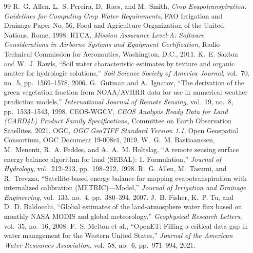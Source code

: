 \documentclass[11pt,a4paper]{article}
\theoremstyle{definition}
\theoremstyle{remark}
\begin{document}
\begin{thebibliography}{99}
 R.~G. Allen, L.~S. Pereira, D.~Raes, and M.~Smith, \textit{Crop Evapotranspiration: Guidelines for Computing Crop Water Requirements}, FAO Irrigation and Drainage Paper No. 56, Food and Agriculture Organization of the United Nations, Rome, 1998.
 RTCA, \textit{Mission Assurance Level-A: Software Considerations in Airborne Systems and Equipment Certification}, Radio Technical Commission for Aeronautics, Washington, D.C., 2011.
 K.~E. Saxton and W.~J. Rawls, ``Soil water characteristic estimates by texture and organic matter for hydrologic solutions,'' \textit{Soil Science Society of America Journal}, vol.~70, no.~5, pp.~1569--1578, 2006.
 G.~Gutman and A.~Ignatov, ``The derivation of the green vegetation fraction from NOAA/AVHRR data for use in numerical weather prediction models,'' \textit{International Journal of Remote Sensing}, vol.~19, no.~8, pp.~1533--1543, 1998.
 CEOS-WGCV, \textit{CEOS Analysis Ready Data for Land (CARD4L) Product Family Specifications}, Committee on Earth Observation Satellites, 2021.
 OGC, \textit{OGC GeoTIFF Standard Version 1.1}, Open Geospatial Consortium, OGC Document 19-008r4, 2019.
 W.~G.~M. Bastiaanssen, M.~Menenti, R.~A. Feddes, and A.~A.~M. Holtslag, ``A remote sensing surface energy balance algorithm for land (SEBAL): 1. Formulation,'' \textit{Journal of Hydrology}, vol.~212--213, pp.~198--212, 1998.
 R.~G. Allen, M.~Tasumi, and R.~Trevzza, ``Satellite-based energy balance for mapping evapotranspiration with internalized calibration (METRIC)---Model,'' \textit{Journal of Irrigation and Drainage Engineering}, vol.~133, no.~4, pp.~380--394, 2007.
 J.~B. Fisher, K.~P. Tu, and D.~D. Baldocchi, ``Global estimates of the land-atmosphere water flux based on monthly NASA MODIS and global meteorology,'' \textit{Geophysical Research Letters}, vol.~35, no.~16, 2008.
 F.~S. Melton et al., ``OpenET: Filling a critical data gap in water management for the Western United States,'' \textit{Journal of the American Water Resources Association}, vol.~58, no.~6, pp.~971--994, 2021.
\end{thebibliography}
\end{document}
